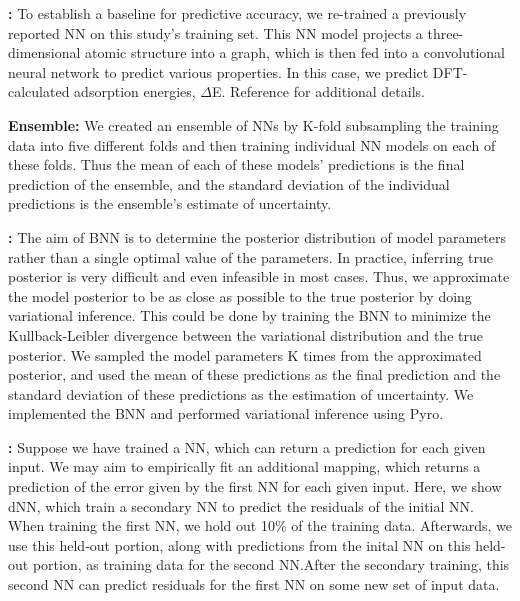 \documentclass[]{achemso}
\begin{document}
\textbf{:}
To establish a baseline for predictive accuracy, we re-trained a previously reported \gls{NN}\cite{Xie2018, Back2019} on this study's training set.
This \gls{NN} model projects a three-dimensional atomic structure into a graph, which is then fed into a convolutional neural network to predict various properties.
In this case, we predict \gls{DFT}-calculated adsorption energies, $\Delta$E.
Reference \citet{Back2019} for additional details.

\textbf{ Ensemble:}
We created an ensemble of \gls{NN}s by K-fold subsampling the training data into five different folds and then training individual \gls{NN} models on each of these folds.
Thus the mean of each of these models' predictions is the final prediction of the ensemble, and the standard deviation of the individual predictions is the ensemble's estimate of uncertainty.

\textbf{:}
The aim of \gls{BNN} is to determine the posterior distribution of model parameters rather than a single optimal value of the parameters.
In practice, inferring true posterior is very difficult and even infeasible in most cases.
Thus, we approximate the model posterior to be as close as possible to the true posterior by doing variational inference.
This could be done by training the \gls{BNN} to minimize the Kullback-Leibler divergence between the variational distribution and the true posterior.
We sampled the model parameters K times from the approximated posterior, and used the mean of these predictions as the final prediction and the standard deviation of these predictions as the estimation of uncertainty.
We implemented the \gls{BNN} and performed variational inference using Pyro.\cite{Bingham2018}

\textbf{:}
Suppose we have trained a NN, which can return a prediction for each given
input.  We may aim to empirically fit an additional mapping, which returns a
prediction of the error given by the first NN for each given input. Here, we
show \gls{dNN}, which train a secondary \gls{NN} to predict the residuals of
the initial \gls{NN}. When training the first NN, we hold out 10\% of the
training data.  Afterwards, we use this held-out portion, along with
predictions from the inital NN on this held-out portion, as training data for
the second NN.\@ After the secondary training, this second NN can predict
residuals for the first NN on some new set of input data.
\end{document}
